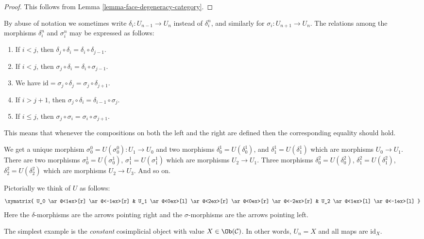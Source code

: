 \begin{proof}
This follows from Lemma \ref{lemma-face-degeneracy-category}.
\end{proof}

\begin{remark}
\label{remark-relations-cosimplicial}
By abuse of notation we sometimes write $\delta_i : U_{n - 1} \to U_n$
instead of $\delta^n_i$, and similarly for $\sigma_i : U_{n + 1} \to U_n$.
The relations among the morphisms $\delta^n_i$ and $\sigma^n_i$
may be expressed as follows:
\begin{enumerate}
\item If $i < j$, then
$\delta_j \circ \delta_i = \delta_i \circ \delta_{j - 1}$.
\item If $i < j$, then
$\sigma_j \circ \delta_i = \delta_i \circ \sigma_{j - 1}$.
\item We have
$\text{id} = \sigma_j \circ \delta_j = \sigma_j \circ \delta_{j + 1}$.
\item If $i > j + 1$, then
$\sigma_j \circ \delta_i = \delta_{i - 1} \circ \sigma_j$.
\item If $i \leq j$, then
$\sigma_j \circ \sigma_i = \sigma_i \circ \sigma_{j + 1}$.
\end{enumerate}
This means that whenever the compositions on both the left and the
right are defined then the corresponding equality should hold.
\end{remark}

\noindent
We get a unique morphism $\sigma^0_0 = U(\sigma^0_0) : U_1 \to U_0$ and
two morphisms $\delta^1_0 = U(\delta^1_0)$, and
$\delta^1_1 = U(\delta^1_1)$ which are morphisms $U_0 \to U_1$.
There are two morphisms
$\sigma^1_0 = U(\sigma^1_0)$, $\sigma^1_1 = U(\sigma^1_1)$
which are morphisms $U_2 \to U_1$. Three morphisms
$\delta^2_0 = U(\delta^2_0)$, $\delta^2_1 = U(\delta^2_1)$,
$\delta^2_2 = U(\delta^2_2)$
which are morphisms $U_2 \to U_3$. And so on.

\medskip\noindent
Pictorially we think of $U$ as follows:
$$
\xymatrix{
U_0
\ar@<1ex>[r]
\ar@<-1ex>[r]
&
U_1
\ar@<0ex>[l]
\ar@<2ex>[r]
\ar@<0ex>[r]
\ar@<-2ex>[r]
&
U_2
\ar@<1ex>[l]
\ar@<-1ex>[l]
}
$$
Here the $\delta$-morphisms are the arrows pointing right and the
$\sigma$-morphisms are the arrows pointing left.

\begin{example}
\label{example-constant-cosimplicial-object}
The simplest example is the {\it constant} cosimplicial object with
value $X \in \Ob(\mathcal{C})$. In other words, $U_n = X$ and
all maps are $\text{id}_X$.
\end{example}

